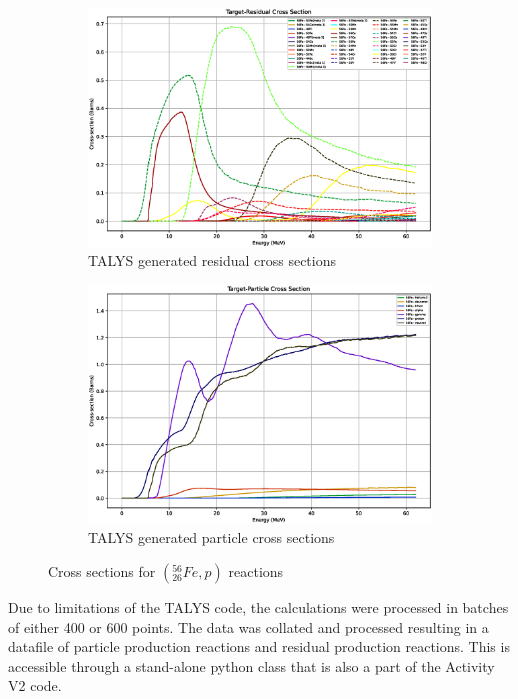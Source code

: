 \begin{figure}[htb]
\begin{subfigure}{0.49\textwidth}
  \includegraphics[width=\linewidth]{chapters/activity_code/tendl-fe56/rxs_p_26056_all.eps}
  \caption{TALYS generated residual cross sections}
  \label{fig:xsdata-residual}
\end{subfigure}\hfil %
\begin{subfigure}{0.49\textwidth}
  \includegraphics[width=\linewidth]{chapters/activity_code/tendl-fe56/pxs_p_26056_all.eps}
  \caption{TALYS generated particle cross sections}
  \label{fig:activity-v2-residual-6}
\end{subfigure}
\caption{Cross sections for $({}^{56}_{26}Fe, p)$ reactions}
\label{fig:xsdata-particle}
\end{figure}


Due to limitations of the TALYS code, the calculations were processed in batches of either 400 or 600 points.  The data was collated and processed resulting in a datafile of particle production reactions and residual production reactions.  This is accessible through a stand-alone python class that is also a part of the Activity V2 code.

